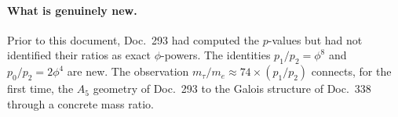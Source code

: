 \paragraph{What is genuinely new.}
Prior to this document, Doc.~293 had computed the $p$-values but had not
identified their ratios as exact $\phi$-powers. The identities
$p_1/p_2 = \phi^8$ and $p_0/p_2 = 2\phi^4$ are new. The observation
$m_\tau/m_e \approx 74\times(p_1/p_2)$ connects, for the first time,
the $A_5$ geometry of Doc.~293 to the Galois structure of Doc.~338 through
a concrete mass ratio.
